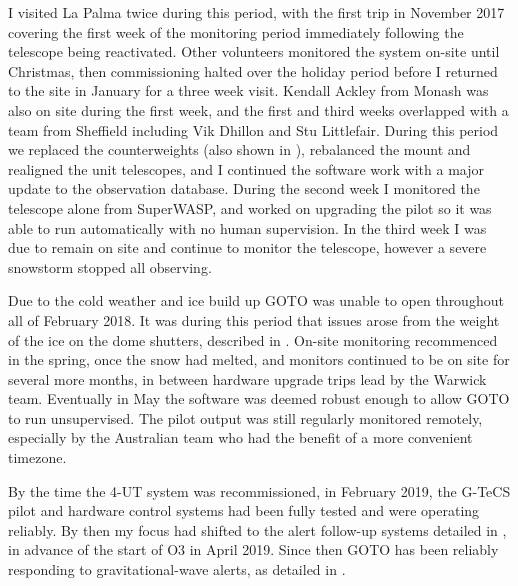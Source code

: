 \begin{colsection}
I visited La Palma twice during this period, with the first trip in November 2017 covering the first week of the monitoring period immediately following the telescope being reactivated. Other volunteers monitored the system on-site until Christmas, then commissioning halted over the holiday period before I returned to the site in January for a three week visit. Kendall Ackley from Monash was also on site during the first week, and the first and third weeks overlapped with a team from Sheffield including Vik Dhillon and Stu Littlefair. During this period we replaced the counterweights (also shown in ), rebalanced the mount and realigned the unit telescopes, and I continued the software work with a major update to the observation database. During the second week I monitored the telescope alone from SuperWASP, and worked on upgrading the pilot so it was able to run automatically with no human supervision. In the third week I was due to remain on site and continue to monitor the telescope, however a severe snowstorm stopped all observing.

Due to the cold weather and ice build up GOTO was unable to open throughout all of February 2018. It was during this period that issues arose from the weight of the ice on the dome shutters, described in . On-site monitoring recommenced in the spring, once the snow had melted, and monitors continued to be on site for several more months, in between hardware upgrade trips lead by the Warwick team. Eventually in May the software was deemed robust enough to allow GOTO to run unsupervised. The pilot output was still regularly monitored remotely, especially by the Australian team who had the benefit of a more convenient timezone.

By the time the 4-UT system was recommissioned, in February 2019, the G-TeCS pilot and hardware control systems had been fully tested and were operating reliably. By then my focus had shifted to the alert follow-up systems detailed in , in advance of the start of O3 in April 2019. Since then GOTO has been reliably responding to gravitational-wave alerts, as detailed in .

\end{colsection}


